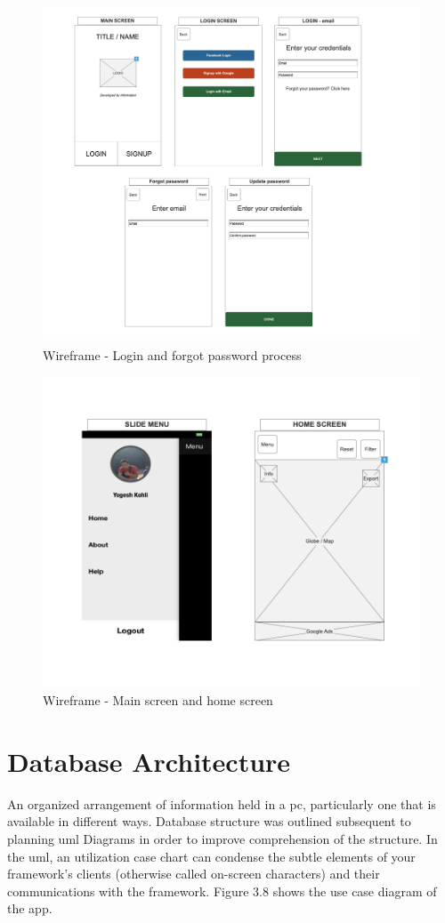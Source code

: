   
  
    \begin{figure}[H]
            \centering
            \includegraphics[width=0.5\linewidth]{figures/ch3/wireframe_2.png}
            \caption{\label{fig:wireframe_2} Wireframe - Login and forgot password process}
    \end{figure}
    
    \begin{figure}[H]
            \centering
            \includegraphics[width=0.5\linewidth]{figures/ch3/wireframe_3.png}
            \caption{\label{fig:wireframe_3} Wireframe - Main screen and home screen}
    \end{figure}


\section{Database Architecture}

An organized arrangement of information held in a \gls{pc}, particularly one that is available in different ways. Database structure was outlined subsequent to planning \gls{uml} Diagrams in order to improve comprehension of the structure. In the \gls{uml}, an utilization case chart can condense the subtle elements of your framework's clients (otherwise called on-screen characters) and their communications with the framework. Figure 3.8 shows the use case diagram of the app.

